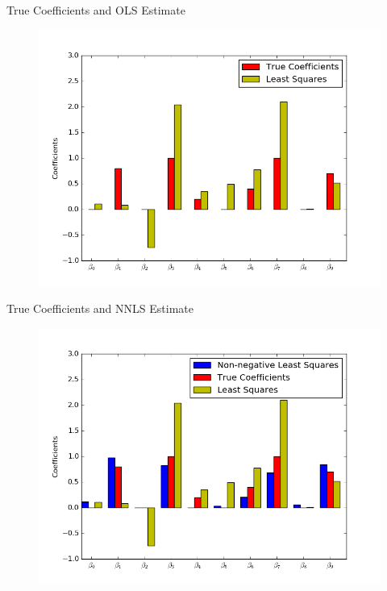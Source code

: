 \documentclass{beamer}
\begin{document}
\begin{frame}{True Coefficients and OLS Estimate}
	\vfill
	\begin{figure}
		\includegraphics[width=1\textwidth]{figs/nnls1.png}
	\end{figure}
	\vfill
\end{frame}

\begin{frame}{True Coefficients and NNLS Estimate}
	\vfill
	\begin{figure}
		\includegraphics[width=1\textwidth]{figs/nnls2.png}
	\end{figure}
	\vfill
\end{frame}
\end{document}
